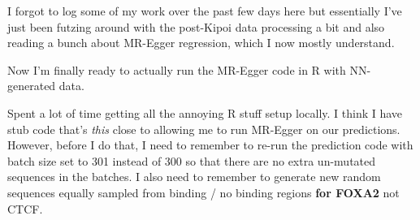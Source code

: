 \begin{Minutes}{}
\maketitle
{}
I forgot to log some of my work over the past few days here but essentially I've just been futzing around with the post-Kipoi data processing a bit and also reading a bunch about MR-Egger regression, which I now mostly understand.

Now I'm finally ready to actually run the MR-Egger code in R with NN-generated data.

Spent a lot of time getting all the annoying R stuff setup locally. I think I have stub code that's \textit{this} close to allowing me to run MR-Egger on our predictions. However, before I do that, I need to remember to re-run the prediction code with batch size set to 301 instead of 300 so that there are no extra un-mutated sequences in the batches. I also need to remember to generate new random sequences equally sampled from binding / no binding regions \textbf{for FOXA2} not CTCF.
\end{Minutes}
